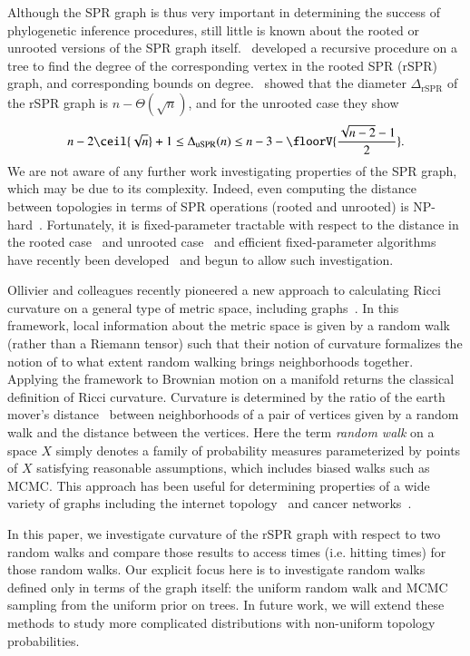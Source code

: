 \documentclass[]{elsarticle}
\begin{document}
Although the SPR graph is thus very important in determining the success of phylogenetic inference procedures, still little is known about the rooted or unrooted versions of the SPR graph itself.
\citep{Song2003-gf}~developed a recursive procedure on a tree to find the degree of the corresponding vertex in the rooted SPR (rSPR) graph, and corresponding bounds on degree.
\citep{Ding2011-bj}~showed that the diameter $\Delta_{\text{rSPR}}$ of the rSPR graph is $n - \Theta(\sqrt n)$, and for the unrooted case they show
\begin{equation}
n - 2\ceil{\sqrt{n}} + 1
\le \Delta_{\text{uSPR}}(n)
\le n - 3 - \floorV{\frac{\sqrt{n - 2} - 1}{2}}.
\end{equation}
We are not aware of any further work investigating properties of the SPR graph, which may be due to its complexity.
Indeed, even computing the distance between topologies in terms of SPR operations (rooted and unrooted) is NP-hard~\citep{bordewich05,hickey2008sdc}.
Fortunately, it is fixed-parameter tractable with respect to the distance in the rooted case~\citep{bordewich05} and unrooted case~\citep{bonet2010complexity} and efficient fixed-parameter algorithms have recently been developed~\citep{Whidden2015-yi,whidden2013hybridization,whidden2016calculating} and begun to allow such investigation.

Ollivier and colleagues recently pioneered a new approach to calculating Ricci curvature on a general type of metric space, including graphs~\citep{Ollivier2009-bw,Joulin2010-jg}.
In this framework, local information about the metric space is given by a random walk (rather than a Riemann tensor) such that their notion of curvature formalizes the notion of to what extent random walking brings neighborhoods together.
Applying the framework to Brownian motion on a manifold returns the classical definition of Ricci curvature.
Curvature is determined by the ratio of the earth mover's distance~\citep{rubner2000earth} between neighborhoods of a pair of vertices given by a random walk and the distance between the vertices.
Here the term \emph{random walk} on a space $X$ simply denotes a family of probability measures parameterized by points of $X$ satisfying reasonable assumptions, which includes biased walks such as MCMC.
This approach has been useful for determining properties of a wide variety of graphs including the internet topology~\citep{ni2015ricci} and cancer networks~\citep{sandhu2015graph}.

In this paper, we investigate curvature of the rSPR graph with respect to two random walks and compare those results to access times (i.e. hitting times) for those random walks.
Our explicit focus here is to investigate random walks defined only in terms of the graph itself: the uniform random walk and MCMC sampling from the uniform prior on trees.
In future work, we will extend these methods to study more complicated distributions with non-uniform topology probabilities.
\end{document}
